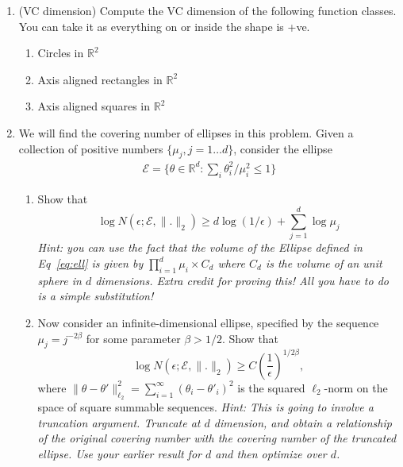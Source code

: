 \documentclass[11pt]{article}
\newcommand{\R}{\mathbb{R}}
\begin{document}
\begin{enumerate}
\begin{enumerate}
\begin{enumerate}
	\end{enumerate}
\end{enumerate}
 \item (VC dimension) Compute the VC dimension of the following function classes. You can take it as everything on or inside the shape is +ve.
\begin{enumerate}
	\item Circles in $\R^2$ 
	\item Axis aligned rectangles in $\R^2$
	\item Axis aligned squares in $\R^2$
\end{enumerate}
\item We will find the covering number of ellipses in this problem.  Given a collection of positive numbers $\{\mu_j,j=1\dots d\}$, consider the ellipse \begin{align}\label{eq:ell}
\mathcal{E}=\{\theta\in\R^d : \sum_i \theta_i^2/\mu_i^2\leq 1\}
\end{align}
\begin{enumerate}
	\item Show that $$\log N(\epsilon; \mathcal{E},\|.\|_2)\geq d\log (1/\epsilon)+\sum_{j=1}^d\log \mu_j$$
	\textit{Hint: you can use the fact that the volume of the Ellipse defined in Eq~\ref{eq:ell} is given by $\prod_{i=1}^d \mu_i \times C_d$ where $C_d$ is the volume of an unit sphere in $d$ dimensions. Extra credit for proving this! All you have to do is a simple substitution!}
	\item Now consider an infinite-dimensional ellipse, specified by the sequence $\mu_j = j^{-2\beta}$
	for some parameter $\beta > 1/2$. Show that
	$$\log N(\epsilon; \mathcal{E},\|.\|_2)\geq C \left(\frac{1}{\epsilon}\right)^{1/2\beta},$$
	where $\|\theta-\theta'\|_{\ell_2}^2=\sum_{i=1}^\infty (\theta_i-\theta'_i)^2$ is the squared $\ell_2$-norm on the space of square summable sequences.
	\textit{Hint: This is going to involve a truncation argument. Truncate at $d$ dimension, and obtain a relationship of the original covering number with the covering number of the truncated ellipse. Use your earlier result for $d$ and then optimize over $d$. }
\end{enumerate}
\end{enumerate}
\end{document}

